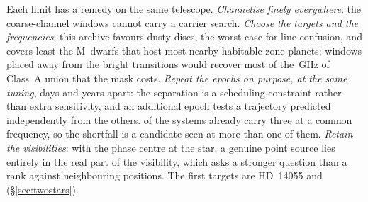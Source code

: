Each limit has a remedy on the same telescope. \emph{Channelise finely
everywhere}: the \NCoarse{} coarse-channel windows cannot carry a carrier
search. \emph{Choose the targets and the frequencies}: this archive favours
dusty discs, the worst case for line confusion, and covers least the M~dwarfs
that host most nearby habitable-zone planets; windows placed away from the bright transitions would recover most of the
\MkMaskAGHz\,GHz of Class~A union that the mask costs. \emph{Repeat the epochs
on purpose, at the same tuning}, days and years apart: the separation is a
scheduling constraint rather than extra sensitivity, and an additional epoch
tests a trajectory predicted independently from the others. \PaNSysThree{} of the
\NSysClassA{} systems already carry three at a common frequency, so the
shortfall is a candidate seen at more than one of them. \emph{Retain the
visibilities}: with the phase centre at the star, a genuine point source lies
entirely in the real part of the visibility, which asks a stronger question
than a rank against neighbouring positions. The first targets are HD~14055 and
\BkAlmaName{} (\S\ref{sec:twostars}).
